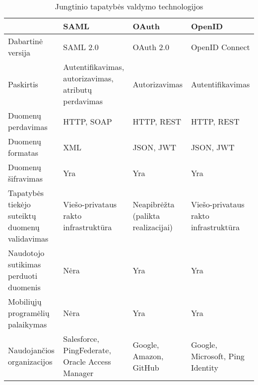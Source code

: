 \begin{table}[H]
  \centering
  \caption{Jungtinio tapatybės valdymo technologijos}
    \begin{tabular}{|p{10.22em}|p{10.11em}|p{7.945em}|p{8.78em}|}
    \hline
    \multicolumn{1}{|r|}{} & \textbf{SAML} & \textbf{OAuth} & \textbf{OpenID} \bigstrut\\
    \hline
    Dabartinė versija & SAML 2.0 & OAuth 2.0 & OpenID Connect \bigstrut\\
    \hline
    Paskirtis & Autentifikavimas, autorizavimas, atributų perdavimas & Autorizavimas & Autentifikavimas \bigstrut\\
    \hline
    Duomenų perdavimas & HTTP, SOAP & HTTP, REST & HTTP, REST \bigstrut\\
    \hline
    Duomenų formatas & XML   & JSON, JWT & JSON, JWT \bigstrut\\
    \hline
    Duomenų šifravimas & Yra   & Yra   & Yra \bigstrut\\
    \hline
    Tapatybės tiekėjo suteiktų duomenų validavimas & Viešo-privataus rakto infrastruktūra & Neapibrėžta (palikta realizacijai) & Viešo-privataus rakto infrastruktūra \bigstrut\\
    \hline
    Naudotojo sutikimas perduoti duomenis & Nėra  & Yra   & Yra \bigstrut\\
    \hline
    Mobiliųjų programėlių palaikymas & Nėra  & Yra   & Yra \bigstrut\\
    \hline
    Naudojančios organizacijos & Salesforce, PingFederate, Oracle Access Manager & Google, Amazon, GitHub & Google, Microsoft, Ping Identity \bigstrut\\
    \hline
    \end{tabular}%
  \label{tab:SSOProtocols}%
\end{table}%



